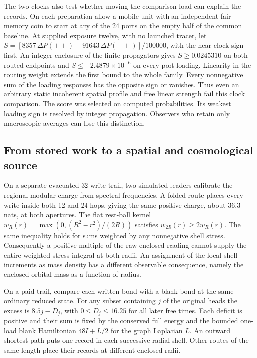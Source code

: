 \documentclass[11pt]{article}
\begin{document}
The two clocks also test whether moving the comparison load can explain
the records. On each preparation allow a mobile unit with an independent
fair memory coin to start at any of the 24 ports on the empty half of
the common baseline. At supplied exposure twelve, with no launched tracer,
let $S=[8357\,\Delta P(++)-91643\,\Delta P(-+)]/100000$, with the near
clock sign first. An integer enclosure of the finite propagators gives
$S\ge0.0245310$ on both routed endpoints and
$S\le-2.4879\times10^{-6}$ on every port loading. Linearity in the routing
weight extends the first bound to the whole family. Every nonnegative
sum of the loading responses has the opposite sign or vanishes. Thus
even an arbitrary static incoherent spatial profile and free linear
strength fail this clock comparison. The score was selected on computed
probabilities. Its weakest loading sign is resolved by integer propagation.
Observers who retain only macroscopic averages can lose this distinction.

\subsection{From stored work to a spatial and cosmological source}

On a separate evacuated 32-write trail, two simulated readers calibrate
the regional modular charge from spectral frequencies. A folded route
places every write inside both 12 and 24 hops, giving the same positive
charge, about $36.3$ nats, at both apertures. The flat rest-ball kernel
$w_R(r)=\max(0,(R^2-r^2)/(2R))$ satisfies $w_{2R}(r)\geq2w_R(r)$.
The same inequality holds for sums weighted by any nonnegative shell
stress. Consequently a positive multiple of the raw enclosed reading
cannot supply the entire weighted stress integral at both radii.
An assignment of the local shell increments as mass density has a
different observable consequence, namely the enclosed orbital mass
as a function of radius.

On a paid trail, compare each written bond with a blank bond at the
same ordinary reduced state. For any subset containing $j$ of the
original heads the excess is $8.5j-D_j$, with $0\le D_j\le16.25$
for all later free times. Each deficit is positive and their sum is
fixed by the conserved full energy and the bounded one-load blank
Hamiltonian $48I+L/2$ for the graph Laplacian $L$. An outward shortest
path puts one record in each successive radial shell. Other routes of
the same length place their records at different enclosed radii.
\end{document}
